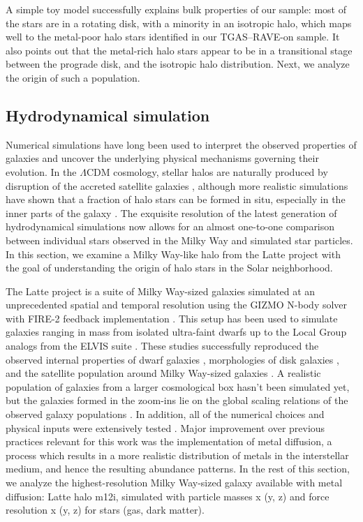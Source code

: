 \documentclass[apj, twocolappendix, numberedappendix, appendixfloats]{emulateapj}
\begin{document}
A simple toy model successfully explains bulk properties of our sample: most of the stars are in a rotating disk, with a minority in an isotropic halo, which maps well to the metal-poor halo stars identified in our TGAS--RAVE-on sample.
It also points out that the metal-rich halo stars appear to be in a transitional stage between the prograde disk, and the isotropic halo distribution.
Next, we analyze the origin of such a population.

\subsection{Hydrodynamical simulation}
\label{sec:latte}
Numerical simulations have long been used to interpret the observed properties of galaxies and uncover the underlying physical mechanisms governing their evolution.
In the $\Lambda$CDM cosmology, stellar halos are naturally produced by disruption of the accreted satellite galaxies \citep[e.g.,][]{bj2005, johnston2008}, although more realistic simulations have shown that a fraction of halo stars can be formed in situ, especially in the inner parts of the galaxy \citep[e.g.,][]{zolotov2009}.
The exquisite resolution of the latest generation of hydrodynamical simulations now allows for an almost one-to-one comparison between individual stars observed in the Milky Way and simulated star particles.
In this section, we examine a Milky Way-like halo from the Latte project \citep{wetzel2016} with the goal of understanding the origin of halo stars in the Solar neighborhood.

The Latte project is a suite of Milky Way-sized galaxies simulated at an unprecedented spatial and temporal resolution using the GIZMO N-body solver \citep{hopkins2015} with FIRE-2 feedback implementation \citep[Feedback In Realistic Environments,][]{hopkins2017}.
This setup has been used to simulate galaxies ranging in mass from isolated ultra-faint dwarfs \citep{wheeler2015} up to the Local Group analogs from the ELVIS suite \citep{gk2014}.
These studies successfully reproduced the observed internal properties of dwarf galaxies \citep{elbadry2016}, morphologies of disk galaxies \citep{ma2016}, and the satellite population around Milky Way-sized galaxies \citep{wetzel2016}.
A realistic population of galaxies from a larger cosmological box hasn't been simulated yet, but the galaxies formed in the zoom-ins lie on the global scaling relations of the observed galaxy populations \citep{hopkins2014, feldmann2016}.
In addition, all of the numerical choices and physical inputs were extensively tested \citep{hopkins2017}.
Major improvement over previous practices relevant for this work was the implementation of metal diffusion, a process which results in a more realistic distribution of metals in the interstellar medium, and hence the resulting abundance patterns.
In the rest of this section, we analyze the highest-resolution Milky Way-sized galaxy available with metal diffusion: Latte halo m12i, simulated with particle masses x (y, z) and force resolution x (y, z) for stars (gas, dark matter).
\end{document}
